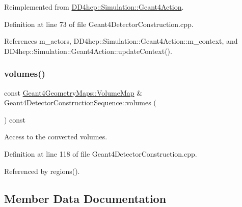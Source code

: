 Reimplemented from \hyperlink{class_d_d4hep_1_1_simulation_1_1_geant4_action_ae3b9daf2af881df956c46568c0743313}{D\+D4hep\+::\+Simulation\+::\+Geant4\+Action}.



Definition at line 73 of file Geant4\+Detector\+Construction.\+cpp.



References m\+\_\+actors, D\+D4hep\+::\+Simulation\+::\+Geant4\+Action\+::m\+\_\+context, and D\+D4hep\+::\+Simulation\+::\+Geant4\+Action\+::update\+Context().

\hypertarget{class_d_d4hep_1_1_simulation_1_1_geant4_detector_construction_sequence_a1f41cef2a30e863953571552d2093314}{}\label{class_d_d4hep_1_1_simulation_1_1_geant4_detector_construction_sequence_a1f41cef2a30e863953571552d2093314} 
\subsubsection{\texorpdfstring{volumes()}{volumes()}}
{\footnotesize\ttfamily const \hyperlink{namespace_d_d4hep_1_1_simulation_1_1_geant4_geometry_maps_a85199a23e6a837678c8e5d5f902fb2e2}{Geant4\+Geometry\+Maps\+::\+Volume\+Map} \& Geant4\+Detector\+Construction\+Sequence\+::volumes (\begin{DoxyParamCaption}{ }\end{DoxyParamCaption}) const}



Access to the converted volumes. 



Definition at line 118 of file Geant4\+Detector\+Construction.\+cpp.



Referenced by regions().



\subsection{Member Data Documentation}
\hypertarget{class_d_d4hep_1_1_simulation_1_1_geant4_detector_construction_sequence_aa67150ae24c47c85655faf5bd89fad28}{}\label{class_d_d4hep_1_1_simulation_1_1_geant4_detector_construction_sequence_aa67150ae24c47c85655faf5bd89fad28} 
